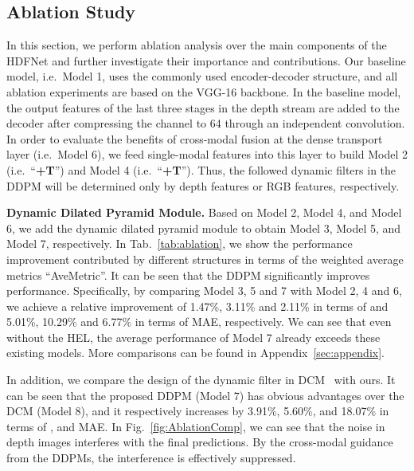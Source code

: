 \documentclass[runningheads]{llncs}
\begin{document}
\subsection{Ablation Study}

In this section, we perform ablation analysis over the main components of the HDFNet and further investigate their importance and contributions. Our baseline model, i.e.\ Model 1, uses the commonly used encoder-decoder structure, and all ablation experiments are based on the VGG-16 backbone. In the baseline model, the output features of the last three stages in the depth stream are added to the decoder after compressing the channel to 64 through an independent  convolution.
In order to evaluate the benefits of cross-modal fusion at the dense transport layer (i.e.\ Model 6), we feed single-modal features into this layer to build Model 2 (i.e.\ ``\textbf{+T}'') and Model 4 (i.e.\ ``\textbf{+T}''). Thus, the followed dynamic filters in the DDPM will be determined only by depth features or RGB features,  respectively.

\noindent\textbf{Dynamic Dilated Pyramid Module.}
Based on Model 2, Model 4, and Model 6, we add the dynamic dilated pyramid module to obtain Model 3, Model 5, and Model 7, respectively.
In Tab.~\ref{tab:ablation}, we show the performance improvement contributed by different structures in terms of the weighted average metrics ``AveMetric''.
It can be seen that the DDPM significantly improves performance.
Specifically, by comparing Model 3, 5 and 7 with Model 2, 4 and 6,  we achieve a relative improvement of 1.47\%, 3.11\% and 2.11\% in terms of  and 5.01\%, 10.29\% and 6.77\% in terms of MAE, respectively.
We can see that even without the HEL, the average performance of Model 7 already exceeds these existing models.
More comparisons can be found in Appendix~\ref{sec:appendix}.

In addition, we compare the design of the dynamic filter in DCM~\cite{DCM} with ours.
It can be seen that the proposed DDPM (Model 7) has obvious advantages over the DCM (Model 8), and it respectively increases by 3.91\%, 5.60\%, and 18.07\% in terms of ,  and MAE.
In Fig.~\ref{fig:AblationComp}, we can see that the noise in depth images interferes with the final predictions. By the cross-modal guidance from the DDPMs, the interference is effectively suppressed.
\end{document}
